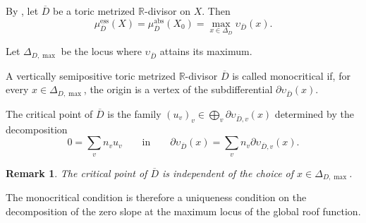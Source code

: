 \documentclass[10pt,a4paper]{amsart}
\theoremstyle{plain}
\newtheorem{remark}[theorem]{Remark}
\theoremstyle{plain}
\numberwithin{equation}{section}
\begin{document}
\begin{prop}
	By \cite[Theorem~3.9 and Corollary~3.10]{BGPS15}, let \(\overline D\) be a
	toric metrized \(\mathbb R\)-divisor on \(X\).  Then
	\[
	\mu^{\mathrm{ess}}_{\overline D}(X)
	=
	\mu^{\mathrm{abs}}_{\overline D}(X_0)
	=
	\max_{x\in\Delta_D}\upsilon_{\overline D}(x).
	\]
\end{prop}


Let \(\Delta_{D,\max}\) be the locus where \(\upsilon_{\overline D}\) attains
its maximum.
\begin{defn}
	A vertically semipositive toric metrized \(\mathbb R\)-divisor
	\(\overline D\) is called monocritical if, for every
	\(x\in\Delta_{D,\max}\), the origin is a vertex of the subdifferential
	\(\partial\upsilon_{\overline D}(x)\).
	
	The critical point of \(\overline D\) is the family
	\((u_v)_v\in\bigoplus_v\partial\upsilon_{\overline D,v}(x)\) determined by the
	decomposition
	\[
	0=\sum_v n_vu_v
	\qquad\text{in}\qquad
	\partial\upsilon_{\overline D}(x)
	=
	\sum_v n_v\partial\upsilon_{\overline D,v}(x).
	\]
	\label{def 3.12}\label{def:monocritical}
\end{defn}
\begin{remark}
	The critical point of \(\overline D\) is independent of the choice of
	\(x\in\Delta_{D,\max}\).
\end{remark}
The monocritical condition is therefore a uniqueness condition on the
decomposition of the zero slope at the maximum locus of the global roof
function.
\end{document}

